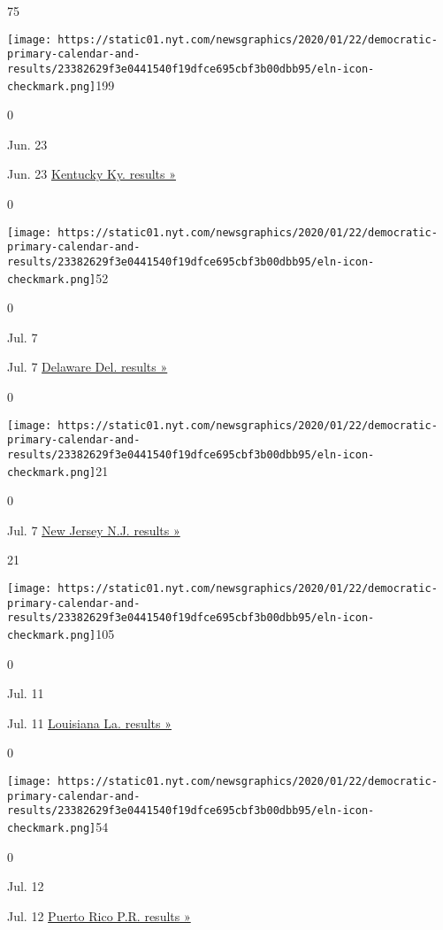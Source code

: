 75

\texttt{[image: https://static01.nyt.com/newsgraphics/2020/01/22/democratic-primary-calendar-and-results/23382629f3e0441540f19dfce695cbf3b00dbb95/eln-icon-checkmark.png]}199

0

Jun. 23

Jun. 23
\href{https://www.nytimes.com/interactive/2020/06/23/us/elections/results-kentucky-primary-elections.html}{Kentucky
Ky. results »}

0

\texttt{[image: https://static01.nyt.com/newsgraphics/2020/01/22/democratic-primary-calendar-and-results/23382629f3e0441540f19dfce695cbf3b00dbb95/eln-icon-checkmark.png]}52

0

Jul. 7

Jul. 7
\href{https://www.nytimes.com/interactive/2020/07/07/us/elections/results-delaware-president-democrat-primary-election.html}{Delaware
Del. results »}

0

\texttt{[image: https://static01.nyt.com/newsgraphics/2020/01/22/democratic-primary-calendar-and-results/23382629f3e0441540f19dfce695cbf3b00dbb95/eln-icon-checkmark.png]}21

0

Jul. 7
\href{https://www.nytimes.com/interactive/2020/07/07/us/elections/results-new-jersey-president-democrat-primary-election.html}{New
Jersey N.J. results »}

21

\texttt{[image: https://static01.nyt.com/newsgraphics/2020/01/22/democratic-primary-calendar-and-results/23382629f3e0441540f19dfce695cbf3b00dbb95/eln-icon-checkmark.png]}105

0

Jul. 11

Jul. 11
\href{https://www.nytimes.com/interactive/2020/07/11/us/elections/results-louisiana-primary-elections.html}{Louisiana
La. results »}

0

\texttt{[image: https://static01.nyt.com/newsgraphics/2020/01/22/democratic-primary-calendar-and-results/23382629f3e0441540f19dfce695cbf3b00dbb95/eln-icon-checkmark.png]}54

0

Jul. 12

Jul. 12
\href{https://www.nytimes.com/interactive/2020/07/12/us/elections/results-puerto-rico-president-democrat-primary-election.html}{Puerto
Rico P.R. results »}

